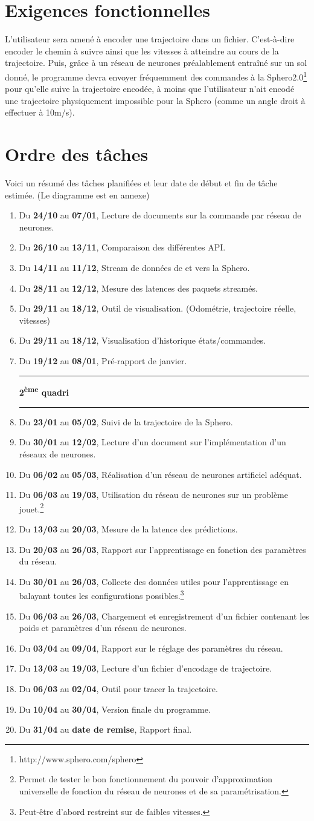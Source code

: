 \documentclass[a4paper, 12pt]{report}
\newcommand{\dure}[2]{\item Du \textbf{#1} au \textbf{#2},}
\newcommand{\rul}{\rule{5cm}{0.3mm}}
\begin{document}


\section*{Exigences fonctionnelles}
L'utilisateur sera amené à encoder une trajectoire dans un fichier. C'est-à-dire encoder le chemin à suivre ainsi que les vitesses à atteindre au cours de la trajectoire.
Puis, grâce à un réseau de neurones préalablement entraîné sur un sol donné, le programme devra envoyer fréquemment des commandes à la Sphero2.0\footnote{http://www.sphero.com/sphero} pour qu'elle suive la trajectoire encodée, à moins que l'utilisateur n'ait encodé une trajectoire physiquement impossible pour la Sphero (comme un angle droit à effectuer à 10m/s).

\section*{Ordre des tâches}
Voici un résumé des tâches planifiées et leur date de début et fin de tâche estimée. (Le diagramme est en annexe)
\begin{enumerate}
 \dure{24/10}{07/01} Lecture de documents sur la commande par réseau de neurones.
 \dure{26/10}{13/11} Comparaison des différentes API.
 \dure{14/11}{11/12} Stream de données de et vers la Sphero.
 \dure{28/11}{12/12} Mesure des latences des paquets streamés.
 \dure{29/11}{18/12} Outil de visualisation. (Odométrie, trajectoire réelle, vitesses)
 \dure{29/11}{18/12} Visualisation d'historique états/commandes.
 \dure{19/12}{08/01} Pré-rapport de janvier.\\ \rul\textbf{2\textsuperscript{ème} quadri}\rul
 \dure{23/01}{05/02} Suivi de la trajectoire de la Sphero.
 \dure{30/01}{12/02} Lecture d'un document sur l'implémentation d'un réseaux de neurones.
 \dure{06/02}{05/03} Réalisation d'un réseau de neurones artificiel adéquat.
 \dure{06/03}{19/03} Utilisation du réseau de neurones sur un problème jouet.\footnote{Permet de tester le bon fonctionnement du pouvoir d'approximation universelle de fonction du réseau de neurones et de sa paramétrisation.}
 \dure{13/03}{20/03} Mesure de la latence des prédictions.
 \dure{20/03}{26/03} Rapport sur l'apprentissage en fonction des paramètres du réseau.
 \dure{30/01}{26/03} Collecte des données utiles pour l'apprentissage en balayant toutes les configurations possibles.\footnote{Peut-être d'abord restreint sur de faibles vitesses.}
 \dure{06/03}{26/03} Chargement et enregistrement d'un fichier contenant les poids et paramètres d'un réseau de neurones.
 \dure{03/04}{09/04} Rapport sur le réglage des paramètres du réseau.
 \dure{13/03}{19/03} Lecture d'un fichier d'encodage de trajectoire.
 \dure{06/03}{02/04} Outil pour tracer la trajectoire.
 \dure{10/04}{30/04} Version finale du programme.
 \dure{31/04}{date de remise} Rapport final.
\end{enumerate}


\end{document}
